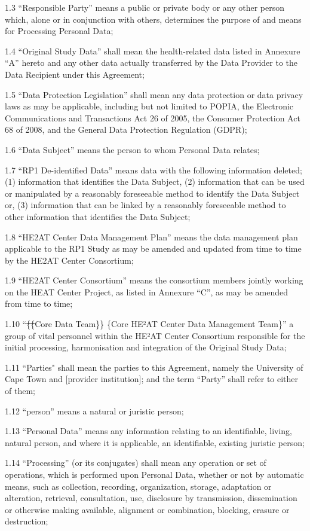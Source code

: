 \documentclass[12pt,letterpaper]{article}
\newcommand{\deleted}[1]{\textcolor{deletecolor}{\sout{#1}}}
\newcommand{\added}[1]{\textcolor{addcolor}{#1}}
\begin{document}
1.3	“Responsible Party” means a public or private body or any other person which, alone or in conjunction with others, determines the purpose of and means for Processing Personal Data;

1.4	“Original Study Data” shall mean the health-related data listed in Annexure “A” hereto and any other data actually transferred by the Data Provider to the Data Recipient under this Agreement;  

1.5	“Data Protection Legislation” shall mean any data protection or data privacy laws as may be applicable, including but not limited to POPIA, the Electronic Communications and Transactions Act 26 of 2005, the Consumer Protection Act 68 of 2008, and the General Data Protection Regulation (GDPR);

1.6	“Data Subject” means the person to whom Personal Data relates;

1.7	“RP1 De-identified Data” means data with the following information deleted; (1) information that identifies the Data Subject, (2) information that can be used or manipulated by a reasonably foreseeable method to identify the Data Subject or, (3) information that can be linked by a reasonably foreseeable method to other information that identifies the Data Subject;  

1.8	“HE2AT Center Data Management Plan” means the data management plan applicable to the RP1 Study as may be amended and updated from time to time by the HE2AT Center Consortium;

1.9	“HE2AT Center Consortium” means the consortium members jointly working on the HEAT Center Project, as listed in Annexure “C”, as may be amended from time to time;

1.10	“\deleted\{\deleted\{Core Data Team\}\} \added\{Core HE²AT Center Data Management Team\}” a group of vital personnel within the HE²AT Center Consortium responsible for the initial processing, harmonisation and integration of the Original Study Data;

1.11	“Parties" shall mean the parties to this Agreement, namely the University of Cape Town and [provider institution]; and the term “Party” shall refer to either of them;

1.12	“person” means a natural or juristic person;

1.13	“Personal Data” means any information relating to an identifiable, living, natural person, and where it is applicable, an identifiable, existing juristic person;	

1.14	“Processing” (or its conjugates) shall mean any operation or set of operations, which is performed upon Personal Data, whether or not by automatic means, such as collection, recording, organization, storage, adaptation or alteration, retrieval, consultation, use, disclosure by transmission, dissemination or otherwise making available, alignment or combination, blocking, erasure or destruction;
\end{document}
